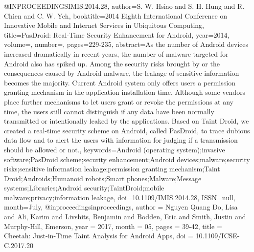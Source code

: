 @INPROCEEDINGS{IMIS.2014.28, 
author={S. W. {Hsiao} and S. H. {Hung} and R. {Chien} and C. W. {Yeh}}, 
booktitle={2014 Eighth International Conference on Innovative Mobile and Internet Services in Ubiquitous Computing}, 
title={PasDroid: Real-Time Security Enhancement for Android}, 
year={2014}, 
volume={}, 
number={}, 
pages={229-235}, 
abstract={As the number of Android devices increased dramatically in recent years, the number of malware targeted for Android also has spiked up. Among the security risks brought by or the consequences caused by Android malware, the leakage of sensitive information becomes the majority. Current Android system only offers users a permission granting mechanism in the application installation time. Although some vendors place further mechanisms to let users grant or revoke the permissions at any time, the users still cannot distinguish if any data have been normally transmitted or intentionally leaked by the applications. Based on Taint Droid, we created a real-time security scheme on Android, called PasDroid, to trace dubious data flow and to alert the users with information for judging if a transmission should be allowed or not.}, 
keywords={Android (operating system);invasive software;PasDroid scheme;security enhancement;Android devices;malware;security risks;sensitive information leakage;permission granting mechanism;Taint Droid;Androids;Humanoid robots;Smart phones;Malware;Message systems;Libraries;Android security;TaintDroid;mobile malware;privacy;information leakage}, 
doi={10.1109/IMIS.2014.28}, 
ISSN={null}, 
month={July},}
@inproceedings{inproceedings,
author = {Nguyen Quang Do, Lisa and Ali, Karim and Livshits, Benjamin and Bodden, Eric and Smith, Justin and Murphy-Hill, Emerson},
year = {2017},
month = {05},
pages = {39-42},
title = {Cheetah: Just-in-Time Taint Analysis for Android Apps},
doi = {10.1109/ICSE-C.2017.20}
}